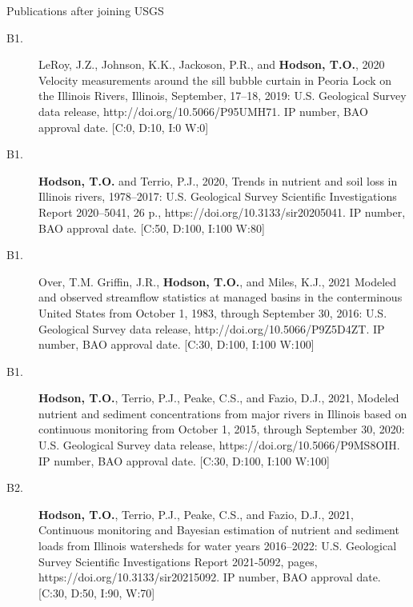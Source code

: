 \documentclass[12pt]{article}
\makeatletter
\def\namedlabel#1#2{\begingroup
	\def\@currentlabel{#2}%
	\label{#1}\endgroup
}
\makeatother
\begin{document}
\centering Publications after joining USGS \\
\vspace{-10pt}
\hrulefill
\raggedright
\vspace{10pt}


\begin{description}

	\item[B1.\namedlabel{peoria_dr}{B1}]
    LeRoy, J.Z., Johnson, K.K., Jackoson, P.R., and \textbf{Hodson, T.O.}, 2020
    Velocity measurements around the sill bubble curtain in Peoria Lock on the Illinois Rivers, Illinois, September, 17--18, 2019:
    U.S. Geological Survey data release, http://doi.org/10.5066/P95UMH71.
    IP number, BAO approval date. [C:0, D:10, I:0 W:0]
    
	\item[B1.\namedlabel{trends}{B1}] 
    \textbf{Hodson, T.O.} and Terrio, P.J., 2020, 
    Trends in nutrient and soil loss in Illinois rivers, 1978–2017:
    U.S. Geological Survey Scientific Investigations Report 2020–5041, 26 p., https://doi.org/10.3133/sir20205041.
    IP number, BAO approval date. [C:50, D:100, I:100 W:80]
    
	\item[B1.\namedlabel{managed_dr}{B1}] 
    Over, T.M. Griffin, J.R., \textbf{Hodson, T.O.}, and Miles, K.J., 2021
    Modeled and observed streamflow statistics at managed basins in the conterminous United States from October 1, 1983,
    through September 30, 2016:
    U.S. Geological Survey data release, http://doi.org/10.5066/P9Z5D4ZT.
    IP number, BAO approval date. [C:30, D:100, I:100 W:100]
    
	\item[B1.\namedlabel{supergages_dr}{B1}] 
    \textbf{Hodson, T.O.}, Terrio, P.J., Peake, C.S., and Fazio, D.J.,
    2021, Modeled nutrient and sediment concentrations from major rivers in Illinois based on continuous monitoring from October 1, 2015, through September 30, 2020:
    U.S. Geological Survey data release, https://doi.org/10.5066/P9MS8OIH.
    IP number, BAO approval date. [C:30, D:100, I:100 W:100]
    
	\item[B2.\namedlabel{supergages}{B2}] 
    \textbf{Hodson, T.O.}, Terrio, P.J., Peake, C.S., and Fazio, D.J., 2021,
    Continuous monitoring and Bayesian estimation of nutrient and sediment loads from Illinois watersheds
    for water years 2016--2022:
    U.S. Geological Survey Scientific Investigations Report 2021-5092, pages, https://doi.org/10.3133/sir20215092.
    IP number, BAO approval date. [C:30, D:50, I:90, W:70]
    

\end{description}
\end{document}
